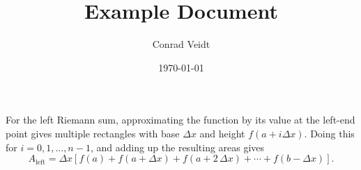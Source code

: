 \documentclass[11pt]{article} %
\title{Example Document}
\author{Conrad Veidt}
\date{\today} %
\begin{document}
\maketitle %
For the left Riemann sum, approximating the function by its value at the
left-end point gives multiple rectangles with base $\Delta x$ and height
$f(a + i\Delta x)$. Doing this for $i = 0, 1, \ldots , n-1$, and adding
up the resulting areas gives
$$
A_\text{left} =
\Delta x \left[f(a) + f(a + \Delta x)
+ f(a+ 2 \, \Delta x)+ \cdots+f(b - \Delta x)\right].
$$
\end{document}
